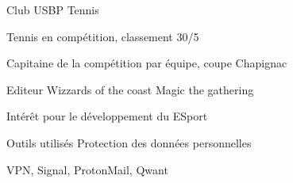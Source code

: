 

\begin{cventries}

  \cventry
    {Club USBP} %
    {Tennis} %
    {} %
    {} %
    {
      \begin{cvitems} %
        \item {Tennis en compétition, classement 30/5}
        \item {Capitaine de la compétition par équipe, coupe Chapignac}
      \end{cvitems}
    }

  \cventry
    {Editeur Wizzards of the coast} %
    {Magic the gathering} %
    {} %
    {} %
    {
      \begin{cvitems} %
        \item {Intérêt pour le développement du ESport}
      \end{cvitems}
    }

  \cventry
    {Outils utilisés} %
    {Protection des données personnelles} %
    {} %
    {} %
    {
      \begin{cvitems} %
        \item {VPN, Signal, ProtonMail, Qwant}
      \end{cvitems}
    }

\end{cventries}
